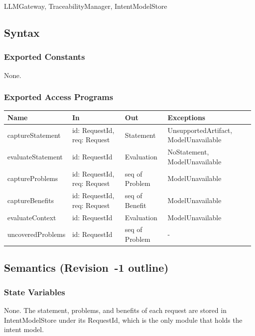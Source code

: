 \documentclass[12pt, titlepage]{article}
\begin{document}
LLMGateway, TraceabilityManager, IntentModelStore

\subsection{Syntax}

\subsubsection{Exported Constants}

None.

\subsubsection{Exported Access Programs}

\begin{center}
\small
\begin{tabular}{>{\raggedright\arraybackslash}p{3.7cm} >{\raggedright\arraybackslash}p{3.8cm} >{\raggedright\arraybackslash}p{3.6cm} >{\raggedright\arraybackslash}p{3.7cm}}
\hline
\textbf{Name} & \textbf{In} & \textbf{Out} & \textbf{Exceptions} \\
\hline
captureStatement & id: RequestId, req: Request & Statement & UnsupportedArtifact, ModelUnavailable \\
evaluateStatement & id: RequestId & Evaluation & NoStatement, ModelUnavailable \\
captureProblems & id: RequestId, req: Request & seq of Problem & ModelUnavailable \\
captureBenefits & id: RequestId, req: Request & seq of Benefit & ModelUnavailable \\
evaluateContext & id: RequestId & Evaluation & ModelUnavailable \\
uncoveredProblems & id: RequestId & seq of Problem & - \\
\hline
\end{tabular}
\end{center}

\subsection{Semantics (Revision~-1 outline)}

\subsubsection{State Variables}

None. The statement, problems, and benefits of each request are stored in
IntentModelStore under its RequestId, which is the only module that holds the
intent model.
\end{document}
